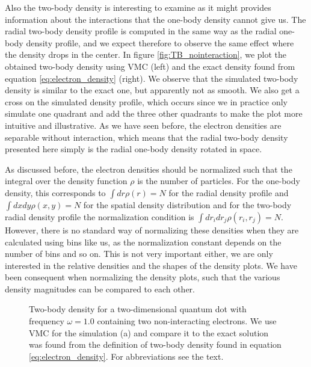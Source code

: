 Also the two-body density is interesting to examine as it might provides information about the interactions that the one-body density cannot give us. The radial two-body density profile is computed in the same way as the radial one-body density profile, and we expect therefore to observe the same effect where the density drops in the center. In figure \eqref{fig:TB_nointeraction}, we plot the obtained two-body density using VMC (left) and the exact density found from equation \eqref{eq:electron_density} (right). We observe that the simulated two-body density is similar to the exact one, but apparently not as smooth. We also get a cross on the simulated density profile, which occurs since we in practice only simulate one quadrant and add the three other quadrants to make the plot more intuitive and illustrative. As we have seen before, the electron densities are separable without interaction, which means that the radial two-body density presented here simply is the radial one-body density rotated in space. 

As discussed before, the electron densities should be normalized such that the integral over the density function $\rho$ is the number of particles. For the one-body density, this corresponds to $\int dr\rho(r)=N$ for the radial density profile and $\int dxdy\rho(x,y)=N$ for the spatial density distribution and for the two-body radial density profile the normalization condition is $\int dr_idr_j\rho(r_i,r_j)=N$. However, there is no standard way of normalizing these densities when they are calculated using bins like us, as the normalization constant depends on the number of bins and so on. This is not very important either, we are only interested in the relative densities and the shapes of the density plots. We have been consequent when normalizing the density plots, such that the various density magnitudes can be compared to each other.

\begin{figure}
	\centering
	\captionsetup[subfigure]{labelformat=empty}
	\caption{Two-body density for a two-dimensional quantum dot with frequency $\omega=1.0$ containing two non-interacting electrons. We use VMC for the simulation (a) and compare it to the exact solution was found from the definition of two-body density found in equation \eqref{eq:electron_density}. For abbreviations see the text.}%
	\label{fig:TB_nointeraction}
\end{figure}

